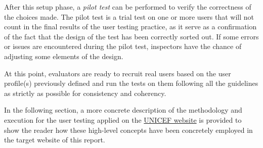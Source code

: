 After this setup phase, a \textit{pilot test} can be performed to verify the correctness of the choices made. The pilot test is a trial test on one or more users that will not count in the final results of the user testing practice, as it serve as a confirmation of the fact that the design of the test has been correctly sorted out.
If some errors or issues are encountered during the pilot test, inspectors have the chance of adjusting some elements of the design.

At this point, evaluators are ready to recruit real users based on the user profile(s) previously defined and run the tests on them following all the guidelines as strictly as possible for consistency and coherency.

In the following section, a more concrete description of the methodology and execution for the user testing applied on the \href{https://www.unicef.org/}{UNICEF website} is provided to show the reader how these high-level concepts have been concretely employed in the target website of this report.